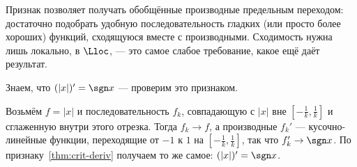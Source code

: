\begin{idea}
Признак позволяет получать обобщённые производные предельным переходом: достаточно
подобрать удобную последовательность гладких (или просто более хороших) функций,
сходящуюся вместе с производными. Сходимость нужна лишь локально, в $\Lloc$, —
это самое слабое требование, какое ещё даёт результат.
\end{idea}

\begin{example}[$(|x|)' = \sgn x$]
Знаем, что $(|x|)' = \sgn x$ — проверим это признаком.
\end{example}

Возьмём $f = |x|$ и последовательность $f_k$, совпадающую с $|x|$ вне
$\left[-\tfrac1k, \tfrac1k\right]$ и сглаженную внутри этого отрезка.
Тогда $f_k \to f$, а производные $f_k'$ — кусочно-линейные функции, переходящие
от $-1$ к $1$ на $\left[-\tfrac1k, \tfrac1k\right]$, так что $f_k' \to \sgn x$.
По признаку~\ref{thm:crit-deriv} получаем то же самое: $(|x|)' = \sgn x$.

